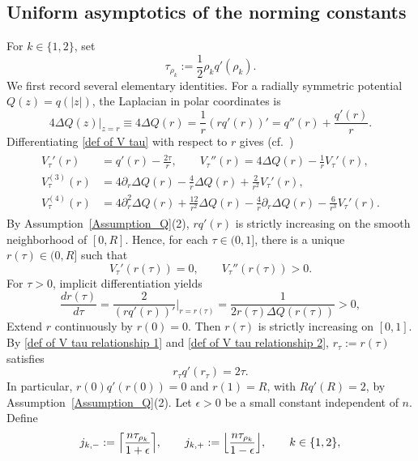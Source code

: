 \documentclass[a4paper]{article}
\numberwithin{equation}{section}
\begin{document}
\subsection{Uniform asymptotics of the norming constants}
\label{subsection:asymptotics of norming constant annulus}
For $k\in\{1,2\}$, set
\begin{equation}
\label{def of tau k ast}
    \tau_{\rho_k}:=\frac{1}{2}\rho_kq'(\rho_{k}). 
\end{equation}
We first record several elementary identities. For a radially symmetric potential $Q(z)=q(|z|)$, the Laplacian in polar coordinates is
\[
4\Delta Q(z)\bigr|_{z=r}\equiv 4\Delta Q(r)=\frac{1}{r}(rq'(r))'=q''(r)+\frac{q'(r)}{r}. 
\]
Differentiating \eqref{def of V tau} with respect to $r$ gives (cf.\ \cite[Eq.~(2.4)]{BKS2023})
\begin{align}
\begin{split}
\label{def of V tau relationship 1}
V_{\tau}'(r)&=q'(r)-\frac{2\tau}{r},\qquad V_{\tau}''(r)=4\Delta Q(r)-\frac{1}{r}V_{\tau}'(r), \\ 
V_{\tau}^{(3)}(r)&=4\partial_{r}\Delta Q(r)-\frac{4}{r}\Delta Q(r)+\frac{2}{r^2}V_{\tau}'(r), \\
V_{\tau}^{(4)}(r)&=4\partial_r^2\Delta Q(r)+\frac{12}{r^2}\Delta Q(r)-\frac{4}{r}\partial_{r}\Delta Q(r)-\frac{6}{r^3}V_{\tau}'(r). 
\end{split}
\end{align} 
By Assumption~\ref{Assumption_Q}(2), $rq'(r)$ is strictly increasing
on the smooth neighborhood of $[0,R]$.  Hence, for each $\tau\in(0,1]$,
there is a unique $r(\tau)\in(0,R]$ such that
\begin{equation}
\label{def of V tau relationship 2}
V_{\tau}'(r(\tau))=0,\qquad V_{\tau}''(r(\tau))>0. 
\end{equation}
For $\tau>0$, implicit differentiation yields
\[
\frac{dr(\tau)}{d\tau}=\frac{2}{(rq'(r))'}\Bigr|_{r=r(\tau)}=\frac{1}{2r(\tau)\Delta Q(r(\tau))}>0,
\]
Extend $r$ continuously by $r(0)=0$.  Then $r(\tau)$ is strictly increasing
on $[0,1]$.  By \eqref{def of V tau relationship 1} and \eqref{def of V tau relationship 2}, $r_{\tau}:=r(\tau)$ satisfies
\begin{equation}
\label{def of rtau q'rtau = 2tau}
r_{\tau}q'(r_{\tau})=2\tau.
\end{equation}
In particular, $r(0)q'(r(0))=0$ and $r(1)=R$, with $Rq'(R)=2$, by Assumption~\ref{Assumption_Q}(2).
Let $\epsilon>0$ be a small constant independent of $n$. 
Define 
\[
j_{k,-}:=\Bigl\lceil\frac{n\tau_{\rho_k}}{1+\epsilon}\Bigr\rceil, \qquad 
j_{k,+}:=\Bigl\lfloor\frac{n\tau_{\rho_k}}{1-\epsilon}\Bigr\rfloor,\qquad k\in\{1,2\},
\]
\end{document}
